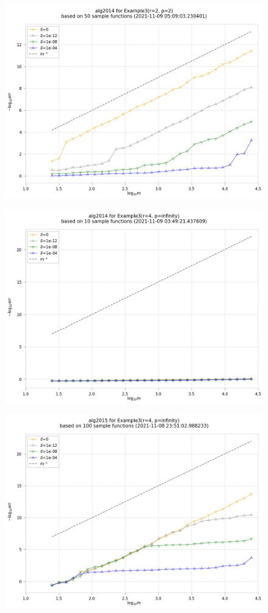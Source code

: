 \documentclass[oik, pdftex, man]{mgrwms}
\begin{document}
    \begin{figure}[h!]
        \centering
        \includegraphics[width=.9\linewidth]{Ex3/algKPp2r2.jpg}
    \end{figure}
    \begin{figure}[h!]
        \centering
        \includegraphics[width=.9\linewidth]{Ex3/algKPpInfr4.jpg}
    \end{figure}
    \begin{figure}[h!]
        \centering
        \includegraphics[width=.9\linewidth]{Ex3/algMPpInf.jpg}
    \end{figure}
\end{document}
